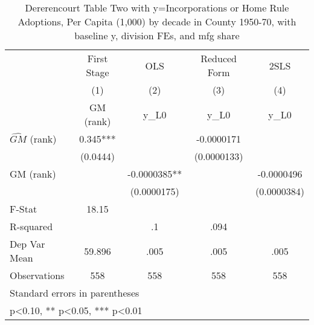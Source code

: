 \begin{table}[htbp]\centering
\def\sym#1{\ifmmode^{#1}\else\(^{#1}\)\fi}
\caption{Dererencourt Table Two with y=Incorporations or Home Rule Adoptions, Per Capita (1,000) by decade in County 1950-70, with baseline y, division FEs, and mfg share}
\begin{tabular}{l*{4}{c}}
\toprule
                    & First Stage   &         OLS   &Reduced Form   &        2SLS   \\
                    &\multicolumn{1}{c}{(1)}&\multicolumn{1}{c}{(2)}&\multicolumn{1}{c}{(3)}&\multicolumn{1}{c}{(4)}\\
                    &\multicolumn{1}{c}{GM  (rank)}&\multicolumn{1}{c}{y\_L0}&\multicolumn{1}{c}{y\_L0}&\multicolumn{1}{c}{y\_L0}\\
\midrule
$\hat{GM}$ (rank)   &       0.345***&               &  -0.0000171   &               \\
                    &    (0.0444)   &               & (0.0000133)   &               \\
\addlinespace
GM  (rank)          &               &  -0.0000385** &               &  -0.0000496   \\
                    &               & (0.0000175)   &               & (0.0000384)   \\
\midrule
F-Stat              &       18.15   &               &               &               \\
R-squared           &               &          .1   &        .094   &               \\
Dep Var Mean        &      59.896   &        .005   &        .005   &        .005   \\
Observations        &         558   &         558   &         558   &         558   \\
\bottomrule
\multicolumn{5}{l}{\footnotesize Standard errors in parentheses}\\
\multicolumn{5}{l}{\footnotesize * p<0.10, ** p<0.05, *** p<0.01}\\
\end{tabular}
\end{table}
